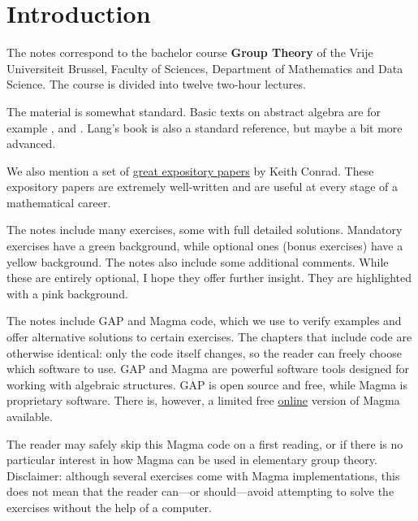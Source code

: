 \thispagestyle{plain}

\section*{Introduction}

The notes correspond to the bachelor 
course \textbf{Group Theory} of the 
Vrije Universiteit Brussel, 
Faculty of Sciences, 
Department of Mathematics and Data Science. The course
is divided into twelve two-hour lectures. 

The material is somewhat standard. Basic texts on abstract algebra are for
example \cite{MR1129886}, \cite{MR2286236} and \cite{MR600654}.  Lang's book
\cite{MR783636} is also a standard reference, but maybe a bit more advanced. 

We also mention a set of \href{https://kconrad.math.uconn.edu/blurbs/}{great
expository papers} by Keith Conrad.  These expository papers are extremely
well-written and are useful at  every stage of a mathematical career.

The notes include many exercises, some with full detailed solutions. Mandatory
exercises have a \colorbox{green!5!white}{green background}, while optional
ones (bonus exercises) have a \colorbox{yellow!15!white}{yellow background}.
The notes also include some additional comments. While these are entirely
optional, I hope they offer further insight. They are highlighted with a
\colorbox{red!5!white}{pink background}.


The notes include GAP and Magma code, which we use to verify examples and offer
alternative solutions to certain exercises. The chapters that include code are
otherwise identical: only the code itself changes, so the reader can freely
choose which software to use. GAP \cite{GAP4} and Magma \cite{zbMATH01077111} are
powerful software tools designed for working with algebraic structures. GAP is
open source and free, while Magma is proprietary software. There is, however, a
limited free \href{https://magma.maths.usyd.edu.au/calc/}{online} version of
Magma available.

The reader may safely skip this Magma code on a first reading, or if there is
no particular interest in how Magma can be used in elementary group theory.
Disclaimer: although several exercises come with Magma implementations, this
does not mean that the reader can—or should—avoid attempting to solve the
exercises without the help of a computer.

